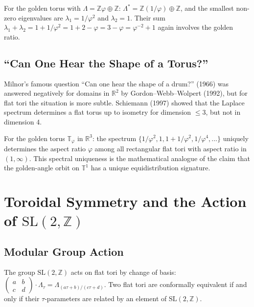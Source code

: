 For the golden torus with $\Lambda = \mathbb{Z}\varphi \oplus \mathbb{Z}$:
$\Lambda^* = \mathbb{Z}(1/\varphi) \oplus \mathbb{Z}$, and the smallest non-zero eigenvalues are
$\lambda_1 = 1/\varphi^2$ and $\lambda_2 = 1$.
Their sum $\lambda_1 + \lambda_2 = 1 + 1/\varphi^2 = 1 + 2 - \varphi = 3 - \varphi = \varphi^{-2} + 1$
again involves the golden ratio.

\subsection{``Can One Hear the Shape of a Torus?''}\label{subsec:ch18-can-hear}

Milnor's famous question ``Can one hear the shape of a drum?'' (1966) was answered
negatively for domains in $\mathbb{R}^2$ by Gordon--Webb--Wolpert (1992), but
for flat tori the situation is more subtle.
Schiemann (1997) showed that the Laplace spectrum determines a flat torus up to
isometry for dimension $\le 3$, but not in dimension 4.

For the golden torus $\mathbb{T}_\varphi$ in $\mathbb{R}^3$:
the spectrum $\{1/\varphi^2, 1, 1 + 1/\varphi^2, 1/\varphi^4, \ldots\}$
uniquely determines the aspect ratio $\varphi$ among all rectangular flat tori
with aspect ratio in $(1, \infty)$.
This spectral uniqueness is the mathematical analogue of the claim that the
golden-angle orbit on $\mathbb{T}^1$ has a unique equidistribution signature.

\section{Toroidal Symmetry and the Action of
  \texorpdfstring{$\mathrm{SL}(2,\mathbb{Z})$}{SL(2,Z)}}
\label{sec:ch18-sl2z}

\subsection{Modular Group Action}\label{subsec:ch18-modular-action}

The group $\mathrm{SL}(2,\mathbb{Z})$ acts on flat tori by change of basis:
$\begin{pmatrix}a&b\\c&d\end{pmatrix} \cdot \Lambda_\tau = \Lambda_{(a\tau+b)/(c\tau+d)}$.
Two flat tori are conformally equivalent if and only if their $\tau$-parameters are
related by an element of $\mathrm{SL}(2,\mathbb{Z})$.

